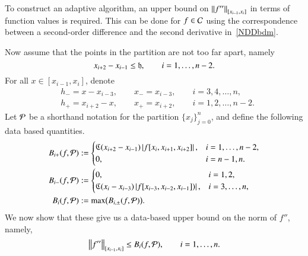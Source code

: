 \documentclass[review]{elsarticle}
\theoremstyle{definition}
\begin{document}
To construct an adaptive algorithm, an upper bound on
$\norm[{[x_{i-1},x_i]}]{f''}$ in terms of function values is required. This can
be done for $f \in \cc$ using the correspondence between a second-order
difference and the second derivative in~\eqref{NDDbdm}.

Now assume that the points in the partition are not too far apart, namely
\begin{equation} \label{widthrestrict}
x_{i+2} - x_{i-1} \le \fh, \qquad i = 1, \ldots, n-2.
\end{equation}
For all $ x \in [x_{i-1},x_i]$,  denote
\begin{align*}
&h_- = x - x_{i-3}, \qquad x_- = x_{i-3},  \qquad i=3,4,\ldots,n,\\
 &h_+ = x_{i+2} - x, \qquad x_+ =  x_{i+2}, \qquad i=1,2,\ldots,n-2.
\end{align*}
Let $\cp$ be a shorthand notation for the partition $\{x_j\}_{j=0}^n$, and
define the following data based quantities.
\begin{subequations} \label{bpdef}
\begin{align}\label{bpf}
B_{i+}(f,\cp)&:=\begin{cases}
\fC(x_{i+2}-x_{i-1})\abs{f[x_i,x_{i+1},x_{i+2}]},  & i=1,\ldots,n-2,
\\ 0, & i=n-1,n.
\end{cases} \\
\label{bmf}
B_{i-}(f,\cp)&: =\begin{cases}
0,  & i=1,2,
\\ \fC(x_{i}-x_{i-3})\abs{f[x_{i-3},x_{i-2},x_{i-1}])}, & i=3,\ldots,n,
\end{cases} \\
\nonumber
B_i(f,\cp) & : = \max\bigl(B_{i,\pm}(f,\cp) \bigr).
\end{align}
\end{subequations}
We now show that these give us a data-based upper bound on the norm of $f''$,
namely,
\begin{equation}\label{normbd}
\norm[{[x_{i-1},x_i]}]{f''} \le B_i(f,\cp), \qquad i =1, \ldots, n.
\end{equation}
\end{document}
